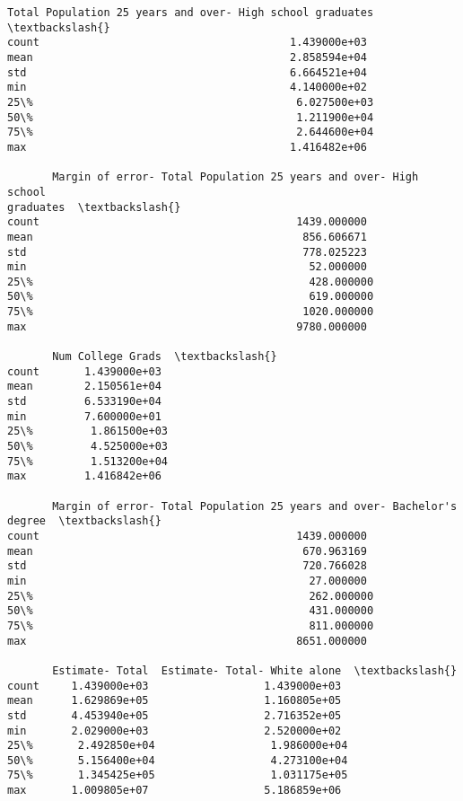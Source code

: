 \documentclass[11pt]{article}
\begin{document}
\begin{tcolorbox}[breakable, size=fbox, boxrule=.5pt, pad at break*=1mm, opacityfill=0]
\begin{Verbatim}[commandchars=\\\{\}]
       Total Population 25 years and over- High school graduates  \textbackslash{}
count                                       1.439000e+03
mean                                        2.858594e+04
std                                         6.664521e+04
min                                         4.140000e+02
25\%                                         6.027500e+03
50\%                                         1.211900e+04
75\%                                         2.644600e+04
max                                         1.416482e+06

       Margin of error- Total Population 25 years and over- High school
graduates  \textbackslash{}
count                                        1439.000000
mean                                          856.606671
std                                           778.025223
min                                            52.000000
25\%                                           428.000000
50\%                                           619.000000
75\%                                          1020.000000
max                                          9780.000000

       Num College Grads  \textbackslash{}
count       1.439000e+03
mean        2.150561e+04
std         6.533190e+04
min         7.600000e+01
25\%         1.861500e+03
50\%         4.525000e+03
75\%         1.513200e+04
max         1.416842e+06

       Margin of error- Total Population 25 years and over- Bachelor's degree  \textbackslash{}
count                                        1439.000000
mean                                          670.963169
std                                           720.766028
min                                            27.000000
25\%                                           262.000000
50\%                                           431.000000
75\%                                           811.000000
max                                          8651.000000

       Estimate- Total  Estimate- Total- White alone  \textbackslash{}
count     1.439000e+03                  1.439000e+03
mean      1.629869e+05                  1.160805e+05
std       4.453940e+05                  2.716352e+05
min       2.029000e+03                  2.520000e+02
25\%       2.492850e+04                  1.986000e+04
50\%       5.156400e+04                  4.273100e+04
75\%       1.345425e+05                  1.031175e+05
max       1.009805e+07                  5.186859e+06


\end{Verbatim}
\end{tcolorbox}
\end{document}
